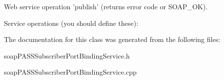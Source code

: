 Web service operation 'publish' (returns error code or SOAP\_\-OK). 

Service operations (you should define these): 

The documentation for this class was generated from the following files:\begin{DoxyCompactItemize}
\item 
soapPASSSubscriberPortBindingService.h\item 
soapPASSSubscriberPortBindingService.cpp\end{DoxyCompactItemize}
